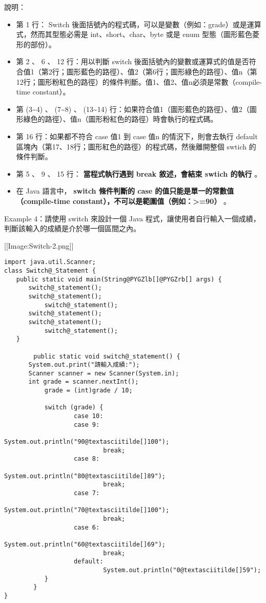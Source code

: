 \documentclass[a4paper,12pt,english]{sphinxmanual}
\begin{document}
說明：
\begin{itemize}
\item {} 
第 1 行： Switch 後面括號內的程式碼，可以是變數（例如：grade）或是運算式，然而其型態必需是 int、short、char、byte 或是 enum 型態（圖形藍色菱形的部份）。

\item {} 
第 2 、 6 、 12 行：用以判斷 switch 後面括號內的變數或運算式的值是否符合值1（第2行；圖形藍色的路徑）、值2（第6行；圖形綠色的路徑）、值n（第12行；圖形粉紅色的路徑）的條件判斷。值1、值2、值n必須是常數（compile-time constant）。

\item {} 
第 (3\textasciitilde{}4) 、 (7\textasciitilde{}8) 、 (13\textasciitilde{}14) 行：如果符合值1（圖形藍色的路徑）、值2（圖形綠色的路徑）、值n（圖形粉紅色的路徑）時會執行的程式碼。

\item {} 
第 16 行：如果都不符合 case 值1 到 case 值n 的情況下，則會去執行 default 區塊內（第17、18行；圖形紅色的路徑）的程式碼，然後離開整個 swtich 的條件判斷。

\item {} 
第 5 、 9 、 15 行： \textbf{當程式執行遇到 break 敘述，會結束 swtich 的執行} 。

\item {} 
在 Java 語言中， \textbf{switch 條件判斷的 case 的值只能是單一的常數值（compile-time constant），不可以是範圍值（例如：\textgreater{}=90）} 。

\end{itemize}

Example 4：請使用 switch 來設計一個 Java 程式，讓使用者自行輸入一個成績，判斷該輸入的成績是介於哪一個區間之內。

{[}{[}Image:Switch-2.png{]}{]}

\begin{Verbatim}[commandchars=@\[\]]
import java.util.Scanner;
class Switch@_Statement {
　　public static void main(String@PYGZlb[]@PYGZrb[] args) {
　　　　switch@_statement();
　　　　switch@_statement();
           switch@_statement();
　　　　switch@_statement();
　　　　switch@_statement();
           switch@_statement();
　　}

        public static void switch@_statement() {
　　　　System.out.print("請輸入成績:");
　　　　Scanner scanner = new Scanner(System.in);
　　　　int grade = scanner.nextInt();
           grade = (int)grade / 10;

           switch (grade) {
                   case 10:
                   case 9:
                           System.out.println("90@textasciitilde[]100");
                           break;
                   case 8:
                           System.out.println("80@textasciitilde[]89");
                           break;
                   case 7:
                           System.out.println("70@textasciitilde[]100");
                           break;
                   case 6:
                           System.out.println("60@textasciitilde[]69");
                           break;
                   default:
                           System.out.println("0@textasciitilde[]59");
           }
        }
}
\end{Verbatim}
\end{document}
